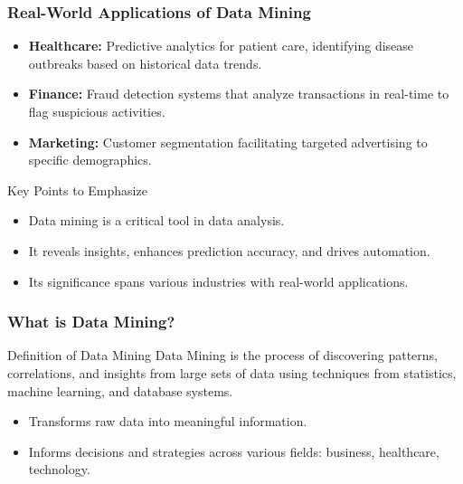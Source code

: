\documentclass[aspectratio=169]{beamer}
\begin{document}
\begin{frame}[fragile]
    \frametitle{Real-World Applications of Data Mining}
    \begin{itemize}
        \item \textbf{Healthcare:} Predictive analytics for patient care, identifying disease outbreaks based on historical data trends.
        
        \item \textbf{Finance:} Fraud detection systems that analyze transactions in real-time to flag suspicious activities.
        
        \item \textbf{Marketing:} Customer segmentation facilitating targeted advertising to specific demographics.
    \end{itemize}

    \begin{block}{Key Points to Emphasize}
        \begin{itemize}
            \item Data mining is a critical tool in data analysis.
            \item It reveals insights, enhances prediction accuracy, and drives automation.
            \item Its significance spans various industries with real-world applications.
        \end{itemize}
    \end{block}
\end{frame}

\begin{frame}[fragile]
    \frametitle{What is Data Mining?}
    \begin{block}{Definition of Data Mining}
        Data Mining is the process of discovering patterns, correlations, and insights from large sets of data using techniques from statistics, machine learning, and database systems. 
    \end{block}
    \begin{itemize}
        \item Transforms raw data into meaningful information.
        \item Informs decisions and strategies across various fields: business, healthcare, technology.
    \end{itemize}
\end{frame}
\end{document}
